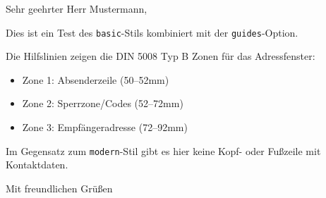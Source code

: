 \documentclass[basic, guides]{../onlinebrief24}
\begin{document}
\begin{letter}{}

\opening{Sehr geehrter Herr Mustermann,}

Dies ist ein Test des \texttt{basic}-Stils kombiniert mit der \texttt{guides}-Option. 

Die Hilfslinien zeigen die DIN 5008 Typ B Zonen für das Adressfenster:
\begin{itemize}
  \item Zone 1: Absenderzeile (50--52mm)
  \item Zone 2: Sperrzone/Codes (52--72mm)
  \item Zone 3: Empfängeradresse (72--92mm)
\end{itemize}

Im Gegensatz zum \texttt{modern}-Stil gibt es hier keine Kopf- oder Fußzeile mit Kontaktdaten.

\closing{Mit freundlichen Grüßen}

\end{letter}
\end{document}

